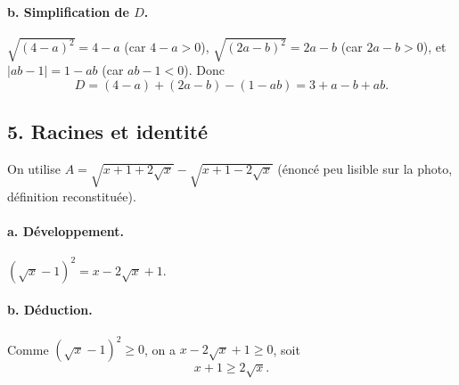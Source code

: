 \documentclass[11pt,a4paper]{article}
\begin{document}
\paragraph{b. Simplification de $D$.}
$\sqrt{(4-a)^2}=4-a$ (car $4-a>0$), $\sqrt{(2a-b)^2}=2a-b$ (car $2a-b>0$), et $\lvert ab-1\rvert=1-ab$ (car $ab-1<0$). Donc
\[
D=(4-a)+(2a-b)-(1-ab)=3+a-b+ab.
\]

\subsection*{5. Racines et identit\'e}

On utilise $A=\sqrt{x+1+2\sqrt x}-\sqrt{x+1-2\sqrt x}$ (\'enonc\'e peu lisible sur la photo, d\'efinition reconstitu\'ee).

\paragraph{a. D\'eveloppement.} $(\sqrt x-1)^2=x-2\sqrt x+1$.

\paragraph{b. D\'eduction.} Comme $(\sqrt x-1)^2\ge0$, on a $x-2\sqrt x+1\ge0$, soit
\[
x+1\ge2\sqrt x.
\]
\end{document}
